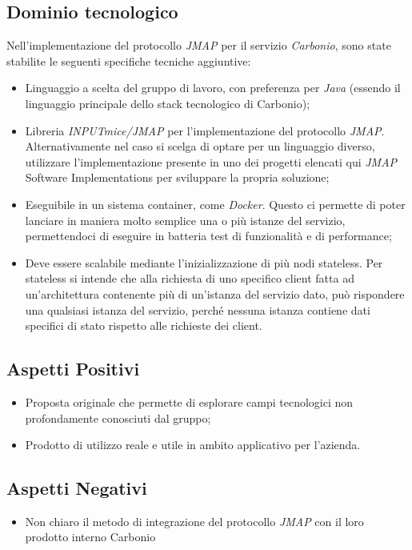 \documentclass{article}
\begin{document}
\subsection{Dominio tecnologico}
 Nell'implementazione del protocollo \textit{JMAP} per il servizio \textit{Carbonio}, sono state stabilite le seguenti specifiche tecniche aggiuntive:
\begin{itemize}
    \item Linguaggio a scelta del gruppo di lavoro, con preferenza per \textit{Java} (essendo il linguaggio principale dello stack tecnologico di Carbonio);
    \item Libreria \textit{INPUTmice/JMAP} per l’implementazione del protocollo \textit{JMAP}. Alternativamente nel caso si scelga di optare per un linguaggio diverso, utilizzare l’implementazione presente in uno dei progetti elencati qui \textit{JMAP} Software Implementations per sviluppare la propria soluzione;
    \item Eseguibile in un sistema container, come \textit{Docker}. Questo ci permette di poter lanciare in maniera molto semplice una o più istanze del servizio, permettendoci di eseguire in batteria test di funzionalità e di performance;
    \item Deve essere scalabile mediante l’inizializzazione di più nodi stateless. Per stateless si intende che alla richiesta di uno specifico client fatta ad un’architettura contenente più di un’istanza del servizio dato, può rispondere una qualsiasi istanza del servizio, perché nessuna istanza contiene dati specifici di stato rispetto alle richieste dei client.
\end{itemize}

\subsection{Aspetti Positivi}
\begin{itemize}
    \item Proposta originale che permette di esplorare campi tecnologici non profondamente conosciuti dal gruppo;
\item Prodotto di utilizzo reale e utile in ambito applicativo per l’azienda.
\end{itemize}

\subsection{Aspetti Negativi}
\begin{itemize}
    \item Non chiaro il metodo di integrazione del protocollo \textit{JMAP} con il loro prodotto interno Carbonio
\end{itemize}
\end{document}
